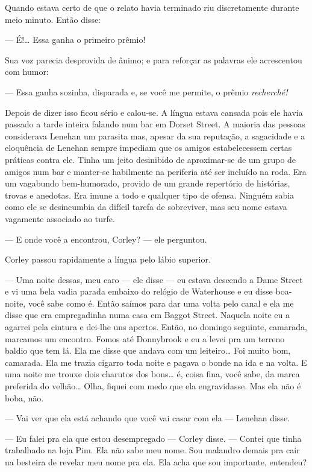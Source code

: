 Quando estava certo de que o relato havia terminado riu discretamente durante
meio minuto.  Então disse:

--- É!\ldots{}  Essa ganha o primeiro prêmio!

Sua voz parecia desprovida de ânimo; e para reforçar as palavras ele
acrescentou com humor:

--- Essa ganha sozinha, disparada e, se você me permite, o prêmio
\textit{recherché!}

Depois de dizer isso ficou sério e calou-se.  A língua estava cansada pois ele
havia passado a tarde inteira falando num bar em Dorset Street.  A maioria das
pessoas considerava Lenehan um parasita mas, apesar da sua reputação, a
sagacidade e a eloquência de Lenehan sempre impediam que os amigos
estabelecessem certas práticas contra ele.  Tinha um jeito desinibido de
aproximar-se de um grupo de amigos num bar e manter-se habilmente na periferia
até ser incluído na roda.  Era um vagabundo bem-humorado, provido de um grande
repertório de histórias, trovas e anedotas.  Era imune a todo e qualquer tipo
de ofensa.  Ninguém sabia como ele se desincumbia da difícil tarefa de
sobreviver, mas seu nome estava vagamente associado ao turfe.

--- E onde você a encontrou, Corley? --- ele perguntou.

Corley passou rapidamente a língua pelo lábio superior.

--- Uma noite dessas, meu caro --- ele disse --- eu estava descendo a Dame
Street e vi uma bela vadia parada embaixo do relógio de Waterhouse e eu disse
boa-noite, você sabe como é.  Então saímos para dar uma volta pelo canal e ela
me disse que era empregadinha numa casa em Baggot Street.  Naquela noite eu a
agarrei pela cintura e dei-lhe uns apertos.  Então, no domingo seguinte,
camarada, marcamos um encontro.  Fomos até Donnybrook e eu a levei pra um
terreno baldio que tem lá.  Ela me disse que andava com um leiteiro\ldots{} Foi
muito bom, camarada.  Ela me trazia cigarro toda noite e pagava o bonde na ida
e na volta.  E uma noite me trouxe dois charutos dos bons\ldots{} é, coisa
fina, você sabe, da marca preferida do velhão\ldots{} Olha, fiquei com medo que
ela engravidasse.  Mas ela não é boba, não.

--- Vai ver que ela está achando que você vai casar com ela --- Lenehan disse.

--- Eu falei pra ela que estou desempregado --- Corley disse.  --- Contei
que tinha trabalhado na loja Pim.  Ela não sabe meu nome.  Sou malandro demais
pra cair na besteira de revelar meu nome pra ela. Ela acha que sou importante,
entendeu?

